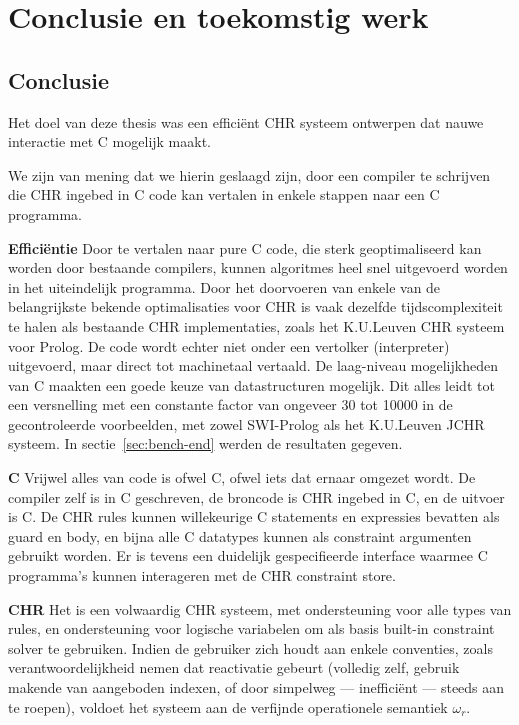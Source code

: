 \chapter{Conclusie en toekomstig werk} \label{chap:concl}

\section{Conclusie} \label{sec:concl}

Het doel van deze thesis was een effici\"ent CHR systeem ontwerpen dat nauwe interactie met C mogelijk maakt.

We zijn van mening dat we hierin geslaagd zijn, door een compiler te schrijven die CHR ingebed in C code kan vertalen in enkele stappen naar een C programma.

{\bf Effici\"entie} Door te vertalen naar pure C code, die sterk geoptimaliseerd kan worden door bestaande compilers, kunnen algoritmes heel snel uitgevoerd worden in het uiteindelijk programma. Door het doorvoeren van enkele van de belangrijkste bekende optimalisaties voor CHR is vaak dezelfde tijdscomplexiteit te halen als bestaande CHR implementaties, zoals het K.U.Leuven CHR systeem voor Prolog. De code wordt echter niet onder een vertolker (interpreter) uitgevoerd, maar direct tot machinetaal vertaald. De laag-niveau mogelijkheden van C maakten een goede keuze van datastructuren mogelijk. Dit alles leidt tot een versnelling met een constante factor van ongeveer 30 tot 10000 in de gecontroleerde voorbeelden, met zowel SWI-Prolog als het K.U.Leuven JCHR systeem. In sectie~\ref{sec:bench-end} werden de resultaten gegeven.

{\bf C} Vrijwel alles van code is ofwel C, ofwel iets dat ernaar omgezet wordt. De compiler zelf is in C geschreven, de broncode is CHR ingebed in C, en de uitvoer is C. De CHR rules kunnen willekeurige C statements en expressies bevatten als guard en body, en bijna alle C datatypes kunnen als constraint argumenten gebruikt worden. Er is tevens een duidelijk gespecifieerde interface waarmee C programma's kunnen interageren met de CHR constraint store.

{\bf CHR} Het is een volwaardig CHR systeem, met ondersteuning voor alle types van rules, en ondersteuning voor logische variabelen om als basis built-in constraint solver te gebruiken. Indien de gebruiker zich houdt aan enkele conventies, zoals verantwoordelijkheid nemen dat reactivatie gebeurt (volledig zelf, gebruik makende van aangeboden indexen, of door simpelweg --- ineffici\"ent --- steeds  aan te roepen), voldoet het systeem aan de verfijnde operationele semantiek $\omega_r$.

